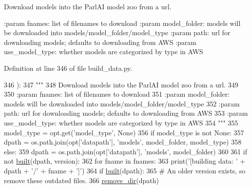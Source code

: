\begin{DoxyVerb}Download models into the ParlAI model zoo from a url.

:param fnames: list of filenames to download
:param model_folder: models will be downloaded into models/model_folder/model_type
:param path: url for downloading models; defaults to downloading from AWS
:param use_model_type: whether models are categorized by type in AWS
\end{DoxyVerb}
 

Definition at line 346 of file build\+\_\+data.\+py.


\begin{DoxyCode}
346 ):
347     \textcolor{stringliteral}{"""}
348 \textcolor{stringliteral}{    Download models into the ParlAI model zoo from a url.}
349 \textcolor{stringliteral}{}
350 \textcolor{stringliteral}{    :param fnames: list of filenames to download}
351 \textcolor{stringliteral}{    :param model\_folder: models will be downloaded into models/model\_folder/model\_type}
352 \textcolor{stringliteral}{    :param path: url for downloading models; defaults to downloading from AWS}
353 \textcolor{stringliteral}{    :param use\_model\_type: whether models are categorized by type in AWS}
354 \textcolor{stringliteral}{    """}
355     model\_type = opt.get(\textcolor{stringliteral}{'model\_type'}, \textcolor{keywordtype}{None})
356     \textcolor{keywordflow}{if} model\_type \textcolor{keywordflow}{is} \textcolor{keywordflow}{not} \textcolor{keywordtype}{None}:
357         dpath = os.path.join(opt[\textcolor{stringliteral}{'datapath'}], \textcolor{stringliteral}{'models'}, model\_folder, model\_type)
358     \textcolor{keywordflow}{else}:
359         dpath = os.path.join(opt[\textcolor{stringliteral}{'datapath'}], \textcolor{stringliteral}{'models'}, model\_folder)
360 
361     \textcolor{keywordflow}{if} \textcolor{keywordflow}{not} \hyperlink{namespaceparlai_1_1core_1_1build__data_ad834e1a9be02e18a6c2de2b03b9a8f10}{built}(dpath, version):
362         \textcolor{keywordflow}{for} fname \textcolor{keywordflow}{in} fnames:
363             print(\textcolor{stringliteral}{'[building data: '} + dpath + \textcolor{stringliteral}{'/'} + fname + \textcolor{stringliteral}{']'})
364         \textcolor{keywordflow}{if} \hyperlink{namespaceparlai_1_1core_1_1build__data_ad834e1a9be02e18a6c2de2b03b9a8f10}{built}(dpath):
365             \textcolor{comment}{# An older version exists, so remove these outdated files.}
366             \hyperlink{namespaceparlai_1_1core_1_1build__data_a24ab3b7e68e41adf774df058d330ff33}{remove\_dir}(dpath)

\end{DoxyCode}
